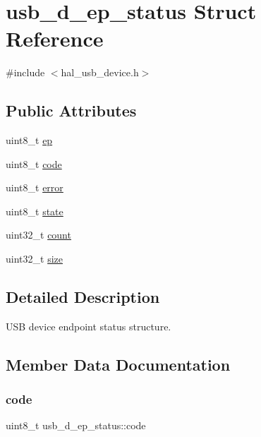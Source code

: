 \hypertarget{structusb__d__ep__status}{}\section{usb\+\_\+d\+\_\+ep\+\_\+status Struct Reference}
\label{structusb__d__ep__status}


{\ttfamily \#include $<$hal\+\_\+usb\+\_\+device.\+h$>$}

\subsection*{Public Attributes}
\begin{DoxyCompactItemize}
\item 
uint8\+\_\+t \hyperlink{structusb__d__ep__status_a3b13c0d91a42e3fc727788d60cbdee92}{ep}
\item 
uint8\+\_\+t \hyperlink{structusb__d__ep__status_a9090be975e0c1346bca9fc0fb5cf36ce}{code}
\item 
uint8\+\_\+t \hyperlink{structusb__d__ep__status_a1f65a74739950821f1742e57a2d25539}{error}
\item 
uint8\+\_\+t \hyperlink{structusb__d__ep__status_ac28adfc05f72116186906662394d8644}{state}
\item 
uint32\+\_\+t \hyperlink{structusb__d__ep__status_a23340a8e7cc82a333ab6c9f68fb4543e}{count}
\item 
uint32\+\_\+t \hyperlink{structusb__d__ep__status_a81459eb4fc0080b63bc1c7e3c35f32ec}{size}
\end{DoxyCompactItemize}


\subsection{Detailed Description}
U\+SB device endpoint status structure. 

\subsection{Member Data Documentation}
\mbox{\label{structusb__d__ep__status_a9090be975e0c1346bca9fc0fb5cf36ce}} 
\subsubsection{\texorpdfstring{code}{code}}
{\footnotesize\ttfamily uint8\+\_\+t usb\+\_\+d\+\_\+ep\+\_\+status\+::code}

